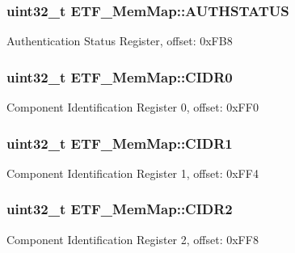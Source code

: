 \subsubsection[{A\+U\+T\+H\+S\+T\+A\+T\+U\+S}]{\setlength{\rightskip}{0pt plus 5cm}uint32\+\_\+t E\+T\+F\+\_\+\+Mem\+Map\+::\+A\+U\+T\+H\+S\+T\+A\+T\+U\+S}\label{struct_e_t_f___mem_map_ae403364ae54b1eb918a559349465a7a8}
Authentication Status Register, offset\+: 0x\+F\+B8 \hypertarget{struct_e_t_f___mem_map_aa11e0d070ab0917209b9dbd000f0dd3f}{}
\subsubsection[{C\+I\+D\+R0}]{\setlength{\rightskip}{0pt plus 5cm}uint32\+\_\+t E\+T\+F\+\_\+\+Mem\+Map\+::\+C\+I\+D\+R0}\label{struct_e_t_f___mem_map_aa11e0d070ab0917209b9dbd000f0dd3f}
Component Identification Register 0, offset\+: 0x\+F\+F0 \hypertarget{struct_e_t_f___mem_map_af7c4231d402d34bc78649e996d0595a5}{}
\subsubsection[{C\+I\+D\+R1}]{\setlength{\rightskip}{0pt plus 5cm}uint32\+\_\+t E\+T\+F\+\_\+\+Mem\+Map\+::\+C\+I\+D\+R1}\label{struct_e_t_f___mem_map_af7c4231d402d34bc78649e996d0595a5}
Component Identification Register 1, offset\+: 0x\+F\+F4 \hypertarget{struct_e_t_f___mem_map_aa4497a28e03196ee5a3d4c6cf8a7892f}{}
\subsubsection[{C\+I\+D\+R2}]{\setlength{\rightskip}{0pt plus 5cm}uint32\+\_\+t E\+T\+F\+\_\+\+Mem\+Map\+::\+C\+I\+D\+R2}\label{struct_e_t_f___mem_map_aa4497a28e03196ee5a3d4c6cf8a7892f}
Component Identification Register 2, offset\+: 0x\+F\+F8 \hypertarget{struct_e_t_f___mem_map_a8ff6c84678887a89964218abe295b05f}{}
